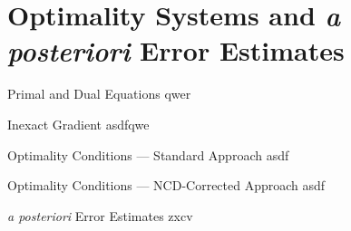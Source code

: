 \section{Optimality Systems and \textit{a posteriori} Error Estimates}

\begin{frame}{Primal and Dual Equations}
    qwer
\end{frame}

\begin{frame}{Inexact Gradient}
    asdfqwe
\end{frame}

\begin{frame}{Optimality Conditions --- Standard Approach}
    asdf
\end{frame}

\begin{frame}{Optimality Conditions --- NCD-Corrected Approach}
    asdf
\end{frame}

\begin{frame}{\textit{a posteriori} Error Estimates}
    zxcv
\end{frame}